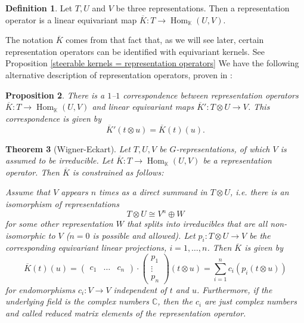 \documentclass[12pt, a4paper]{article}
\theoremstyle{plain}
\newtheorem{pro}{Proposition}[section]
\newtheorem{thm}[pro]{Theorem}
\theoremstyle{definition}
\newtheorem{dfn}[pro]{Definition}
\theoremstyle{remark}
\newcommand{\C}{\mathds{C}}
\newcommand{\K}{\mathds{K}}
\DeclareMathOperator{\Hom}{Hom}
\begin{document}
\begin{dfn}
Let $T, U$ and $V$ be three representations. Then a representation operator is a linear equivariant map $\overline{K}: T \to \Hom_{\K}(U, V)$.
\end{dfn}

The notation $\overline{K}$ comes from that fact that, as we will see later, certain representation operators can be identified with equivariant kernels. See Proposition \ref{steerable kernels = representation operators}
We have the following alternative description of representation operators, proven in \cite{wigner-eckart}:

\begin{pro}\label{correspondence}
There is a $1$–$1$ correspondence between representation operators $\overline{K}: T \to \Hom_{\K}(U,V)$ and linear equivariant maps $\overline{K}': T \otimes U \to V$. This correspondence is given by
\begin{equation*}
\overline{K}'(t \otimes u) = \overline{K}(t)(u).
\end{equation*}
\end{pro}

\begin{thm}[Wigner-Eckart]\label{theorem}
Let $T, U, V$ be $G$-representations, of which $V$ is assumed to be irreducible. Let $\overline{K}: T \to \Hom_{\K}(U, V)$ be a representation operator. Then $\overline{K}$ is constrained as follows:

Assume that $V$ appears $n$ times as a direct summand in $T \otimes U$, i.e. there is an isomorphism of representations
\begin{equation*}
T \otimes U \cong V^n \oplus W
\end{equation*}
for some other representation $W$ that splits into irreducibles that are all non-isomorphic to $V$ ($n = 0$ is possible and allowed). Let $p_i: T \otimes U \to V$ be the corresponding equivariant linear projections, $i = 1, \dots, n$. Then $\overline{K}$ is given by
\begin{equation*}
\overline{K}(t)(u) = \begin{pmatrix}c_1 & \hdots & c_n \end{pmatrix} \cdot \begin{pmatrix} p_1 \\ \vdots \\ p_n \end{pmatrix} (t \otimes u)= \sum_{i = 1}^{n}c_i \left( p_i(t \otimes u) \right)
\end{equation*}
for endomorphisms $c_i: V \to V$ independent of $t$ and $u$. Furthermore, if the underlying field is the complex numbers $\C$, then the $c_i$ are just complex numbers and called reduced matrix elements of the representation operator.
\end{thm}
\end{document}

